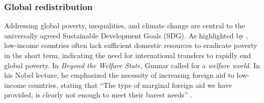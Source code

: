 

\subsubsection{Global redistribution}\label{subsubsec:literature_redistribution}
Addressing global poverty, inequalities, and climate change are central to the universally agreed Sustainable Development Goals (SDG). %
As highlighted by \citet{bolch_arithmetics_2022}, low-income countries often lack sufficient domestic resources to eradicate poverty in the short term, indicating the need for international transfers to rapidly end global poverty. %
In \textit{Beyond the Welfare State}, Gunnar \citet{myrdal_beyond_1960} called for a \textit{welfare world}. In his Nobel lecture, he emphasized the necessity of increasing foreign aid to low-income countries, stating that ``The type of marginal foreign aid we have provided, is clearly not enough to meet their barest needs'' \citep{myrdal_equality_1975}.

